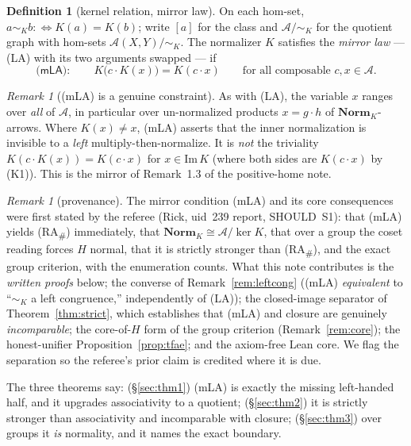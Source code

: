 \documentclass[11pt]{amsart}
\theoremstyle{plain}
\theoremstyle{definition}
\newtheorem{definition}[theorem]{Definition}
\theoremstyle{remark}
\newtheorem{remark}[theorem]{Remark}
\newcommand{\Norm}{\mathbf{Norm}}
\newcommand{\Img}{\mathrm{Im}\,}
\newcommand{\LA}{\textsf{(LA)}}
\newcommand{\mLA}{\textsf{(mLA)}}
\newcommand{\RA}{\textsf{(RA}\textsubscript{\#}\textsf{)}}
\newcommand{\simK}{\mathrel{\sim_{K}}}
\begin{document}
\begin{definition}[kernel relation, mirror law]
\label{def:mLA}
On each hom-set, $a\simK b:\Leftrightarrow K(a)=K(b)$; write $[a]$ for the class and
$\mathcal{A}/\!\simK$ for the quotient graph with hom-sets $\mathcal{A}(X,Y)/\!\simK$. The normalizer
$K$ satisfies the \emph{mirror law} --- \LA{} with its two arguments swapped --- if
\[
  \mLA{}\colon\qquad K\big(c\cdot K(x)\big)=K(c\cdot x)\qquad\text{for all composable }c,x\in\mathcal{A}.
\]
\end{definition}

\begin{remark}[\mLA{} is a genuine constraint]
\label{rem:genuine}
As with \LA{}, the variable $x$ ranges over \emph{all} of $\mathcal{A}$, in particular over
un-normalized products $x=g\cdot h$ of $\Norm_K$-arrows. Where $K(x)\ne x$, \mLA{} asserts that the
inner normalization is invisible to a \emph{left} multiply-then-normalize. It is \emph{not} the
triviality $K(c\cdot K(x))=K(c\cdot x)$ for $x\in\Img K$ (where both sides are $K(c\cdot x)$ by
\textsf{(K1)}). This is the mirror of Remark~1.3 of the positive-home note.
\end{remark}

\begin{remark}[provenance]
\label{rem:provenance}
The mirror condition \mLA{} and its core consequences were first stated by the referee
(Rick, uid~239 report, SHOULD~S1): that \mLA{} yields \RA{} immediately, that
$\Norm_K\cong\mathcal{A}/\!\ker K$, that over a group the coset reading forces $H$ normal, that it is
strictly stronger than \RA{}, and the exact group criterion, with the enumeration counts. What this
note contributes is the \emph{written proofs} below; the converse of Remark~\ref{rem:leftcong}
(\mLA{} \emph{equivalent} to ``$\simK$ a left congruence,'' independently of \LA{}); the
closed-image separator of Theorem~\ref{thm:strict}, which establishes that \mLA{} and closure are
genuinely \emph{incomparable}; the core-of-$H$ form of the group criterion
(Remark~\ref{rem:core}); the honest-unifier Proposition~\ref{prop:tfae}; and the axiom-free Lean
core. We flag the separation so the referee's prior claim is credited where it is due.
\end{remark}

The three theorems say: (§\ref{sec:thm1}) \mLA{} is exactly the missing left-handed half, and it
upgrades associativity to a quotient; (§\ref{sec:thm2}) it is strictly stronger than associativity
and incomparable with closure; (§\ref{sec:thm3}) over groups it \emph{is} normality, and it names the
exact boundary.
\end{document}
